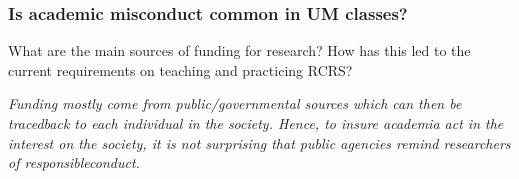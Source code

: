 \documentclass{beamer}
\begin{document}


\begin{frame}

\frametitle{Is academic misconduct common in UM classes?}

\end{frame}

\begin{frame} %

  What are the main sources of funding for research? How has this led to the current requirements on teaching and practicing RCRS?

{\it Funding  mostly  come  from  public/governmental  sources  which  can  then  be  tracedback to each individual in the society.  Hence, to insure academia act in the interest on the society, it is not surprising that public agencies remind researchers of responsibleconduct.}
  






\end{frame}
\end{document}
